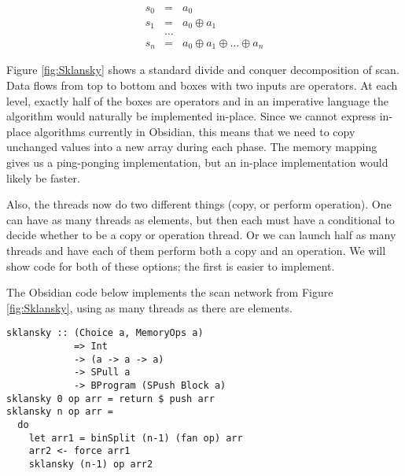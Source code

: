 \begin{equation*} 
  \begin{array} {rcl} 
    s_0 & = & a_0 \\
    s_1 & = & a_0 \oplus a_1 \\ 
    & \ldots & \\
    s_n & = & a_0 \oplus a_1 \oplus \ldots \oplus a_n
  \end{array}
\end{equation*} 



Figure \ref{fig:Sklansky}
shows a standard divide and conquer decomposition of scan. Data
flows from top to bottom and boxes with two inputs are
operators. At each level, exactly half of the boxes are operators
and in an imperative language the algorithm would naturally be implemented
in-place.
Since we cannot express in-place algorithms 
currently in Obsidian, this means that we need to copy unchanged values into a new array 
during each phase. The memory mapping gives us a ping-ponging implementation, but an in-place implementation would likely be faster.

Also, the threads now do two different things 
(copy, or perform operation). 
One can have as many threads as elements, but then each must have
a conditional to decide whether to be a copy or operation thread.
Or we can launch half as many threads and have each of them perform 
both a copy and an operation. 
We will show code for both of these options; the first is
easier to implement.


The Obsidian code below implements the scan network from Figure \ref{fig:Sklansky}, using as many threads as there are elements.

\begin{small} 
\begin{Verbatim}[samepage=true]
sklansky :: (Choice a, MemoryOps a)
            => Int
            -> (a -> a -> a)
            -> SPull a
            -> BProgram (SPush Block a)
sklansky 0 op arr = return $ push arr
sklansky n op arr =
  do 
    let arr1 = binSplit (n-1) (fan op) arr
    arr2 <- force arr1
    sklansky (n-1) op arr2
\end{Verbatim} 
\end{small} %

